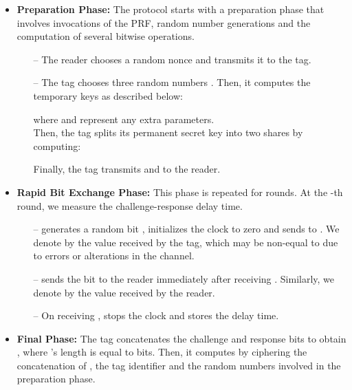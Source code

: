 \documentclass{article}
\begin{document}
\begin{itemize}
\item \textbf{Preparation Phase:} The protocol starts with a preparation phase that involves invocations of the PRF, random number generations and the computation of several bitwise operations.
\begin{itemize}
  \item [--] The reader chooses a random nonce  and transmits it to the tag.
  \item [--] The tag chooses three random numbers . Then, it computes the temporary keys  as described below:

      where  and  represent any extra parameters.\\
      Then, the tag splits its permanent secret key  into two shares by computing:
      
      Finally, the tag transmits  and  to the reader.
\end{itemize}

 \item \textbf{Rapid Bit Exchange Phase:} This phase is repeated for  rounds. At the -th round, we measure the challenge-response delay time.
    \begin{itemize}
             \item[--]   generates a random bit , initializes the clock to zero and sends  to . We denote by  the value received by the tag, which may be non-equal to  due to errors or alterations in the channel.
             \item[--]  sends the bit  to the reader immediately after receiving . Similarly, we denote by  the value received by the reader.
             \item[--] On receiving ,  stops the clock and stores the delay time.
    \end{itemize}
\item \textbf{Final Phase:} The tag concatenates the challenge and response bits to obtain , where 's length is equal to  bits.  Then, it computes  by ciphering the concatenation of , the tag identifier  and the random numbers involved in the preparation phase.
    

\end{itemize}
\end{document}

